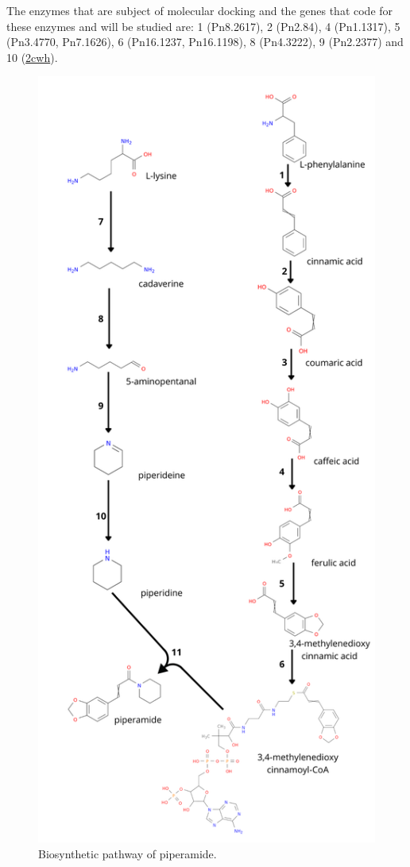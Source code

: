 \documentclass[12pt]{article}
\begin{document}
	The enzymes that are subject of molecular docking and the genes that code for these enzymes and will be studied are: 1 (Pn8.2617), 2 (Pn2.84), 4 (Pn1.1317), 5 (Pn3.4770, Pn7.1626), 6 (Pn16.1237, Pn16.1198), 8 (Pn4.3222), 9 (Pn2.2377) and 10 (\href{https://www.rcsb.org/structure/2CWH}{2cwh}).
	
	
	\FloatBarrier
	\begin{figure}[h]
		\centering
		\includegraphics[scale=0.35]{Pathway2.png}
		\caption{Biosynthetic pathway of piperamide.}
		\label{fig1}
	\end{figure}
	\FloatBarrier
	
\end{document}
